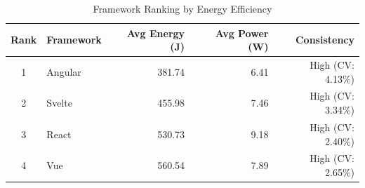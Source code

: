 \begin{table}[htbp]
\centering
\caption{Framework Ranking by Energy Efficiency}
\label{tab:framework_ranking}
\begin{tabular}{clrrr}
\toprule
\textbf{Rank} & \textbf{Framework} & \textbf{Avg Energy (J)} & \textbf{Avg Power (W)} & \textbf{Consistency} \\
\midrule
1 & Angular  &  381.74 &   6.41 & High (CV: 4.13\%) \\
2 & Svelte   &  455.98 &   7.46 & High (CV: 3.34\%) \\
3 & React    &  530.73 &   9.18 & High (CV: 2.40\%) \\
4 & Vue      &  560.54 &   7.89 & High (CV: 2.65\%) \\
\bottomrule
\end{tabular}
\end{table}